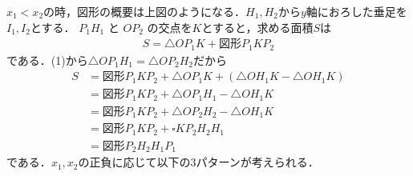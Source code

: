 \documentclass[../../main.tex]{subfiles}
\begin{document}
$x_1<x_2$の時，図形の概要は上図のようになる．$H_1,H_2$から$y$軸におろした垂足を$I_1,I_2$とする．
$P_1H_1$ と $OP_2$ の交点を$K$とすると，求める面積$S$は
\begin{align}
  S = \triangle OP_1K + \text{図形}P_1KP_2 \label{eq:2}
\end{align}
である．(1)から$\triangle OP_1 H_1 =\triangle OP_2 H_2$だから
\begin{align}
  S
  &= \text{図形}P_1KP_2 + \triangle OP_1K + (\triangle OH_1K - \triangle OH_1K) \\
  &= \text{図形}P_1KP_2 + \triangle OP_1H_1 - \triangle OH_1K \\
  &= \text{図形}P_1KP_2 + \triangle OP_2H_2 - \triangle OH_1K \\
  &= \text{図形}P_1KP_2 + \square KP_2H_2H_1 \\
  &= \text{図形} P_2H_2H_1P_1
\end{align}
である．$x_1,x_2$の正負に応じて以下の$3$パターンが考えられる．
\end{document}
